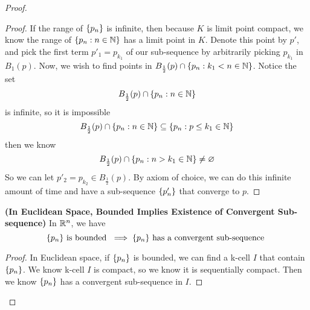 \documentclass{report}
\begin{document}
\begin{proof}
\begin{proof}
If the range of $\{ p_n \}$ is infinite, then because $K$ is limit point compact, we know  the range of  $\{ p_n:n\in\mathbb{N} \}$ has a limit point in $K$. Denote this point  by $p'$, and pick the first term $p'_1=p_{k_1}$ of our sub-sequence by arbitrarily picking  $p_{k_1}$ in  $B_1(p)$. Now, we wish to find points in $B_{\frac{1}{2}}(p)\cap \{ p_n:k_1<n\in\mathbb{N} \}$. Notice the set
\begin{equation}
B_{\frac{1}{2}}(p)\cap \{ p_n:n\in\mathbb{N} \}
\end{equation}
is infinite, so  it is impossible
\begin{equation}
B_{\frac{1}{2}}(p)\cap \{ p_n:n\in\mathbb{N} \}\subseteq \{ p_n:p\leq k_1\in\mathbb{N} \}
\end{equation}
then we know 
\begin{equation}
\text{ $B_{\frac{1}{2}}(p)\cap \{ p_n:n>k_1\in\mathbb{N} \}\neq \varnothing$  }
\end{equation}
So we can let $p'_2=p_{k_2}\in B_{\frac{1}{2}}(p)$. By axiom of choice, we can do this infinite amount of time and have a sub-sequence $\{ p'_n \}$ that converge to $p$.
\end{proof}
\begin{theorem}
\label{1.12.8}
\textbf{(In Euclidean Space, Bounded Implies Existence of Convergent Sub-sequence)} In $\mathbb{R}^n$, we have
 \begin{equation}
\{ p_n \}\text{ is bounded }\implies \{ p_n \}\text{ has a convergent sub-sequence }
\end{equation}
\end{theorem}
\begin{proof}
In Euclidean space, if $\{ p_n \}$ is bounded, we can find a k-cell $I$ that contain  $\{ p_n \}$. We know k-cell $I$ is compact, so we know it is sequentially compact. Then we know  $\{ p_n \}$ has a convergent sub-sequence in $I$. 
\end{proof}

\end{proof}
\end{document}
